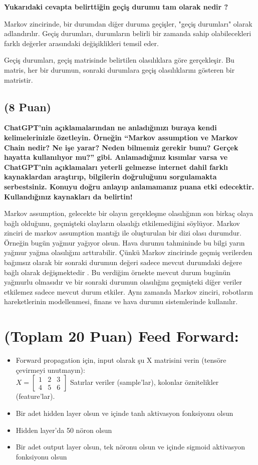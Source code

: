 \documentclass[11pt]{article}
\begin{document}
\textbf{Yukarıdaki cevapta belirttiğin geçiş durumu tam olarak nedir ?}

Markov zincirinde, bir durumdan diğer duruma geçişler, "geçiş durumları" olarak adlandırılır. Geçiş durumları, durumların belirli bir zamanda sahip olabilecekleri farklı değerler arasındaki değişiklikleri temsil eder.

Geçiş durumları, geçiş matrisinde belirtilen olasılıklara göre gerçekleşir. Bu matris, her bir durumun, sonraki durumlara geçiş olasılıklarını gösteren bir matristir.

\subsection{(8 Puan)} \textbf{ChatGPT’nin açıklamalarından ne anladığınızı buraya kendi kelimelerinizle özetleyin. Örneğin ``Markov assumption ve Markov Chain nedir? Ne işe yarar? Neden bilmemiz gerekir bunu? Gerçek hayatta kullanılıyor mu?'' gibi. Anlamadığınız kısımlar varsa ve ChatGPT’nin açıklamaları yeterli gelmezse internet dahil farklı kaynaklardan araştırıp, bilgilerin doğruluğunu sorgulamakta serbestsiniz. Konuyu doğru anlayıp anlamamanız puana etki edecektir. Kullandığınız kaynakları da belirtin!}

Markov assumption, gelecekte bir olayın gerçekleşme olasılığının son birkaç olaya bağlı olduğunu, geçmişteki olayların olasılığı etkilemediğini söylüyor. Markov zinciri de markov assumption mantığı ile oluşturulan bir dizi olası durumdur. Örneğin bugün yağmur yağıyor olsun. Hava durumu tahmininde bu bilgi yarın yağmur yağma olasılığını arttırabilir. Çünkü Markov zincirinde geçmiş verilerden bağımsız olarak bir sonraki durumun  değeri sadece mevcut durumdaki değere
bağlı olarak değişmektedir . Bu verdiğim örnekte mevcut durum bugünün yağmurlu olmasıdır ve bir sonraki durumun olasılığını geçmişteki diğer veriler etkilemez sadece mevcut durum etkiler.
Aynı zamanda Markov zinciri, robotların hareketlerinin modellenmesi, finans ve hava durumu sistemlerinde kullanılır.

\section{(Toplam 20 Puan) Feed Forward:}
 
\begin{itemize}
    \item Forward propagation için, input olarak şu X matrisini verin (tensöre çevirmeyi unutmayın):\\
    $X = \begin{bmatrix}
        1 & 2 & 3\\
        4 & 5 & 6
        \end{bmatrix}$
    Satırlar veriler (sample'lar), kolonlar öznitelikler (feature'lar).
    \item Bir adet hidden layer olsun ve içinde tanh aktivasyon fonksiyonu olsun
    \item Hidden layer'da 50 nöron olsun
    \item Bir adet output layer olsun, tek nöronu olsun ve içinde sigmoid aktivasyon fonksiyonu olsun
\end{itemize}
\end{document}

